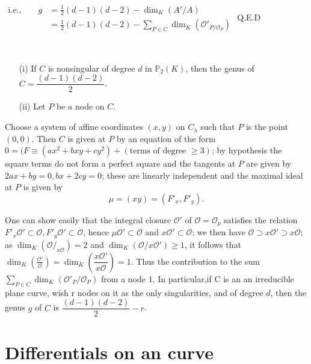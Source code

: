 $\begin{aligned}
\text{i.e.,}\qquad g & = \frac{1}{2} (d-1)(d-2)- \dim_K (A'/A)\\
&= \frac{1}{2}(d-1)(d-2)- \sum_{P \in C} \dim_K (\mathscr{O}'_{P/\mathscr{O}_P}) 
\end{aligned}$ \hfill Q.E.D

\begin{examples*}%
~

  \begin{enumerate}
  \item[(i)]  If $C$ is nonsingular of degree $d$ in $\mathbb{P}_2
    (K)$, then the genus of $C=  \dfrac{(d-1) (d-2)} {2}$. 
  \item[(ii)] Let $P$ be $a$ node on $C$.
  \end{enumerate}

  Choose a system of affine coordinates $(x,y)$ on $C_\lambda$ such
  that $P$ is the point  $(0,0)$.  Then $C$ is given at $P$ by an
  equation of the form $ 0= (F \equiv(ax^2+bxy+cy^2) +(\text{terms of
    degree } \geq 3)$; by hypothesis the square terms do not form a
  perfect square and the tangents at $P$ are given by $2ax+by=0,
  bx+2cy=0$; these are linearly independent and the maximal ideal at
  $P$ is given by 
  $$
  \mu = (x y)= (F'_x, F'_y).
  $$
\end{examples*} 

One can show easily that the integral closure $\mathscr{O}'$ of
$\mathscr{O} =\mathscr{O}_p $ satisfies the relation $F'_x
\mathscr{O}' \subset \mathscr{O}, F'_y \mathscr{O}'
\subset\mathscr{O}$, hence $\mu \mathscr{O}' \subset
\mathscr{O}$ and $x \mathscr{O} ' \subset \mathscr{O}$; we then
have  $   \mathscr{O} \supset x \mathscr{O} ' \supset x \mathscr{O}$;
as $\dim_K (\mathscr{O}/_{x \mathscr{O}})=2$ and 
$\dim_K  (\mathscr{O}/x \mathscr{O}')\geq 1$, 
it follows that $\dim_K \left(\frac{\mathscr{O}'}{\mathscr{O}}\right)
= \dim_K \left(\dfrac {x 
  \mathscr{O}'} {x \mathscr{O}}\right)=1$. Thus the contribution to
the sum   
$ \sum \limits_{P \in C}  \dim_K  (\mathscr{O}'_P/ \mathscr{O}_P)$
from a node $1$. In particular,if C is an an irreducible plane curve,
wish r nodes on it as the only singularities, and of degree $d$, then
the  genus $g$ of $C$ is   $ \dfrac{(d-1) (d-2)} {2}-r$. 

\section{Differentials on an curve}\label{chap2:sec2}%

